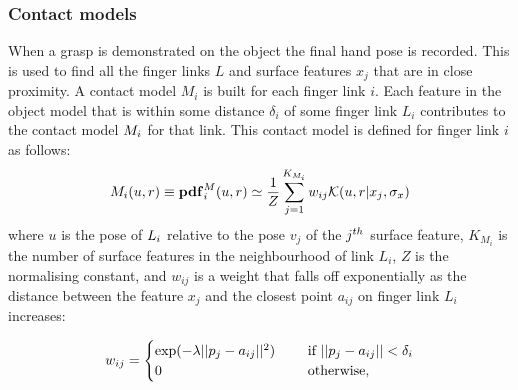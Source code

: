\subsubsection{Contact models}
When a grasp is demonstrated on the object the final hand pose is recorded. This is used to find all the finger links $L$ and surface features $x_j$ that are in close proximity. A contact model $M_i$ is built for each finger link $i$. Each feature in the object model that is within some distance $\delta_i$ of some finger link $L_i$ contributes to the contact model $M_i$ for that link. This contact model is defined for finger link $i$ as follows:
\begin{equation}
\cm_i(u, r) \equiv \pdf^\cm_i(u, r) \simeq \frac{1}{Z} \sum_{j=1}^{K_{M_i}} w_{ij} \mathcal{K}(u, r | {x_j}, \sigma_{x})
\label{eq:cm}
\end{equation}
where $u$ is the pose of $L_i$ relative to the pose $v_j$ of the $j^{\mathnormal{th}}$ surface feature, $K_{M_i}$ is the number of surface features in the neighbourhood of link $L_i$, $Z$ is the normalising constant, and $w_{ij}$ is a weight that falls off exponentially as the distance between the feature $x_j$ and the closest point $a_{ij}$ on finger link $L_i$ increases:

\begin{equation}
w_{ij} = \begin{cases}\exp(-\lambda ||p_j-a_{ij}||^2) \quad &\textnormal{ if } ||p_j-a_{ij}|| < \delta_i\\
0 \quad &\textnormal{ otherwise},\end{cases}
\label{eq:learning.modeldist.wgh}
\end{equation}

